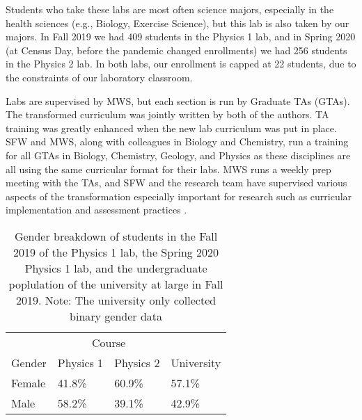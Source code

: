 \documentclass[aip, numerical, preprint]{revtex4-2}
\begin{document}
Students who take these labs are most often science majors, especially in the health sciences
(e.g., Biology, Exercise Science), but this lab is also taken by our majors.  In Fall 2019 we
had 409 students in the Physics 1 lab, and in Spring 2020 (at Census Day, before the pandemic
changed enrollments) we had 256 students in the Physics 2 lab.  In both labs, our enrollment is
capped at 22 students, due to the constraints of our laboratory classroom.

Labs are supervised by MWS, but each section is run by Graduate TAs (GTAs). The transformed
curriculum was jointly written by both of the authors.  TA training was greatly enhanced when
the new lab curriculum was put in place.  SFW and MWS, along with colleagues in Biology and
Chemistry, run a training for all GTAs in Biology, Chemistry, Geology, and Physics as these
disciplines are all using the same curricular format for their labs.  MWS runs a weekly prep
meeting with the TAs, and SFW and the research team have supervised various aspects of the
transformation especially important for research such as curricular implementation \cite{AL's
  paper} and assessment practices \cite{Wolf2019}.


\begin{table}
  \centering
  \begin{tabular}{l|ll|l}
    \hline \hline							
    &	\multicolumn{2}{c|}{Course}\\
    Gender	&	Physics 1	&	Physics 2	&	University	\\ \hline
    Female	&	41.8\%	&	60.9\%	&	57.1\%	\\
    Male	&	58.2\%	&	39.1\%	&	42.9\%	\\
    \hline \hline							
  \end{tabular}
  \caption{Gender breakdown of students in the Fall 2019 of the Physics 1 lab, the Spring 2020
    Physics 1 lab, and the undergraduate poplulation of the university at large in Fall 2019.
    Note: The university only collected binary gender data }
  \label{tab:gender}
\end{table}
\end{document}
